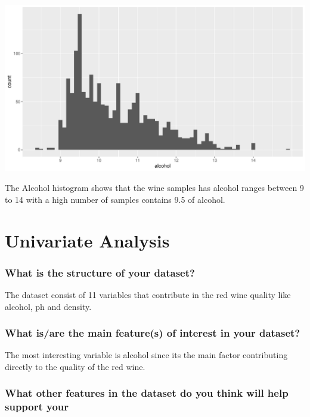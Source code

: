 \documentclass[]{article}
\begin{document}
\begin{center}\includegraphics{Figs/unnamed-chunk-11-1} \end{center}

The Alcohol histogram shows that the wine samples has alcohol ranges
between 9 to 14 with a high number of samples contains 9.5 of alcohol.

\hypertarget{univariate-analysis}{%
\section{Univariate Analysis}\label{univariate-analysis}}

\hypertarget{what-is-the-structure-of-your-dataset}{%
\subsubsection{What is the structure of your
dataset?}\label{what-is-the-structure-of-your-dataset}}

The dataset consist of 11 variables that contribute in the red wine
quality like alcohol, ph and density.

\hypertarget{what-isare-the-main-features-of-interest-in-your-dataset}{%
\subsubsection{What is/are the main feature(s) of interest in your
dataset?}\label{what-isare-the-main-features-of-interest-in-your-dataset}}

The most interesting variable is alcohol since its the main factor
contributing directly to the quality of the red wine.

\hypertarget{what-other-features-in-the-dataset-do-you-think-will-help-support-your}{%
\subsubsection{\texorpdfstring{What other features in the dataset do you
think will help support your\\
}{What other features in the dataset do you think will help support your }}\label{what-other-features-in-the-dataset-do-you-think-will-help-support-your}}
\end{document}
